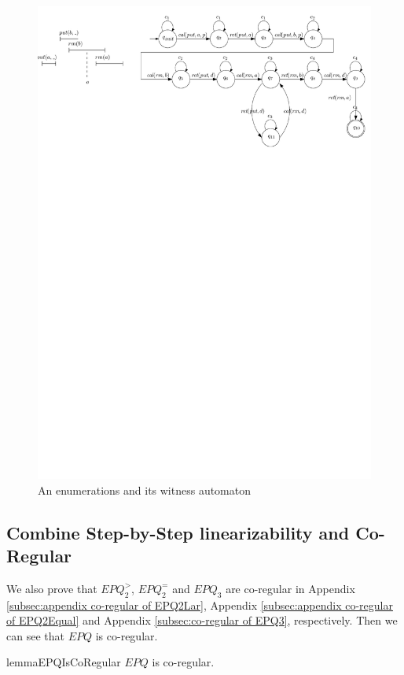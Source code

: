 \begin{figure}[htbp]
  \centering
  \includegraphics[width=0.8 \textwidth]{figures/PIC-Enumeration-WitnessAutomata.pdf}
  \caption{An enumerations and its witness automaton}
  \label{fig:an enumeration and its witness automaton}
\end{figure}


\subsection{Combine Step-by-Step linearizability and Co-Regular}
\label{subsec:combine step-by-step linearizability and co-regular}

We also prove that $\textit{EPQ}_2^{>}$, $\textit{EPQ}_2^{=}$ and $\textit{EPQ}_3$ are co-regular in Appendix \ref{subsec:appendix co-regular of EPQ2Lar}, Appendix \ref{subsec:appendix co-regular of EPQ2Equal} and Appendix \ref{subsec:co-regular of EPQ3}, respectively. Then we can see that $\textit{EPQ}$ is co-regular.

\begin{restatable}{lemma}{EPQIsCoRegular}
\label{lemma:EPQ is co-regular}
$\textit{EPQ}$ is co-regular.
\end{restatable}

